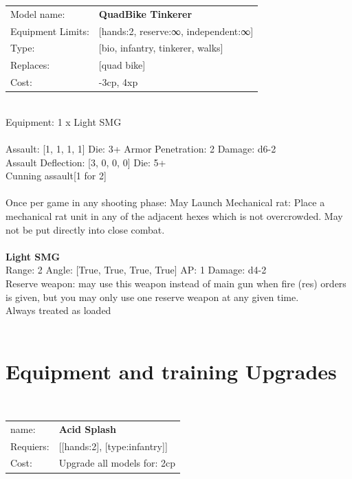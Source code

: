 \noindent
\begin{tabular}{ll}
Model name: &{\bf QuadBike Tinkerer } \\
Equipment Limits: &[hands:2, reserve:∞, independent:∞] \\
Type: &[bio, infantry, tinkerer, walks] \\
Replaces: &[quad bike] \\
Cost: & -3cp, 4xp\\
\end{tabular}
\ \\
Equipment: 1 x Light SMG \\
\ \\
Assault: [1, 1, 1, 1] Die: 3+ Armor Penetration: 2 Damage: d6-2 \\
Assault Deflection: [3, 0, 0, 0] Die: 5+\\
\indent Cunning assault[1 for 2]\\ 
 
\ \\
Once per game in any shooting phase: May Launch Mechanical rat: Place a mechanical rat unit in any of the adjacent hexes which is not overcrowded. May not be put directly into close combat. \\ 

\ \\
{\bf Light SMG } \\



Range: 2  Angle: [True, True, True, True] AP: 1 Damage: d4-2 \\
Reserve weapon: may use this weapon instead of main gun when fire (res) orders is given, but you may only use one reserve weapon at any given time.\\ 
Always treated as loaded\\ 




 
\ \\

\section{Equipment and training Upgrades}\ \\
\begin{tabular}{ll}
name: & {\bf Acid Splash } \\
Requiers: & [[hands:2], [type:infantry]] \\
Cost: & Upgrade all models for: 2cp \\
\end{tabular}



